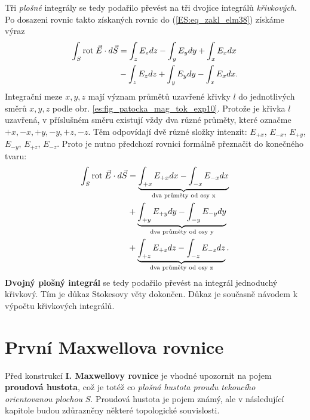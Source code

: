         Tři \emph{plošné} integrály se tedy podařilo převést na tři dvojice integrálů 
        \emph{křivkových}. Po dosazeni rovnic takto získaných rovnic do (\ref{ES:eq_zakl_elm38}) 
        získáme výraz
        \begin{align*}
          \int_{S}\mathrm{rot}\;\vec{E}\cdot d\vec{S} 
            &= \int_zE_zdz - \int_yE_ydy + \int_xE_xdx                     \\
            &- \int_zE_zdz + \int_yE_ydy - \int_xE_xdx.
        \end{align*}
        Integrační meze \(x, y, z\) mají význam průmětů uzavřené křivky \(l\) do jednotlivých směrů 
        \(x, y, z\) podle obr. \ref{es:fig_patocka_mag_tok_exp10}. Protože je křivka \(l\) 
        uzavřená, v příslušném směru existují vždy dva různé průměty, které označme \(+x, -x, +y, 
        -y, +z, -z\). Těm odpovídají dvě různé složky intenzit: \(E_{+x}\), \(E_{-x}\), \(E_{+y}\), 
        \(E_{-y}\), \(E_{+z}\), \(E_{-z}\). Proto je nutno předchozí rovnici formálně přeznačit do 
        konečného tvaru:
        \begin{align*}
          \int_{S}\mathrm{rot}\;\vec{E}\cdot d\vec{S} 
             &= \underbrace{\int_{+x}E_{+x}dx - \int_{-x}E_{-x}dx}_\text{dva průměty od osy x}  \\
             &+ \underbrace{\int_{+y}E_{+y}dy - \int_{-y}E_{-y}dy}_\text{dva průměty od osy y}  \\ 
             &+ \underbrace{\int_{+z}E_{+z}dz - \int_{-z}E_{-z}dz}_\text{dva průměty od osy z}.
        \end{align*}
        \textbf{Dvojný plošný integrál} se tedy podařilo převést na integrál jednoduchý křivkový. 
        Tím je důkaz Stokesovy věty dokončen. Důkaz je současně návodem k výpočtu křivkových 
        integrálů.
        
    \section{První Maxwellova rovnice}\label{ES:sec07}
      Před konstrukcí \textbf{I. Maxwellovy rovnice} je vhodné upozornit na pojem \textbf{proudová 
      hustota}, což je totéž co \emph{plošná hustota proudu tekoucího orientovanou plochou} \(S\). 
      Proudová hustota je pojem známý, ale v následující kapitole budou zdůrazněny některé 
      topologické souvislosti.
      
